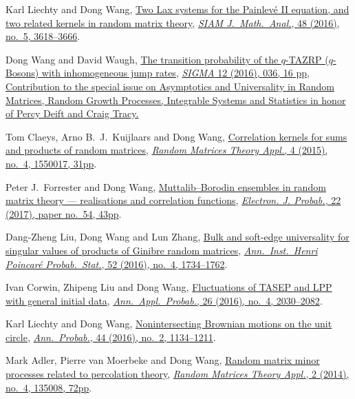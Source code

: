 \documentclass[12pt, a4paper]{article}
\begin{document}
\begin{etaremune}
  Karl Liechty and Dong Wang, \href{http://arxiv.org/abs/1601.01603}{Two Lax systems for the Painlev\'{e} II equation, and two related kernels in random matrix theory}, \href{https://doi.org/10.1137/16M1056080}{\textit{SIAM J.\ Math.\ Anal.}, 48 (2016), no.\ 5, 3618--3666}.
\item
  Dong Wang and David Waugh, \href{http://arxiv.org/abs/1512.01612}{The transition probability of the $q$-TAZRP ($q$-Bosons) with inhomogeneous jump rates}, \href{https://doi.org/10.3842/SIGMA.2016.037}{\textit{SIGMA} 12 (2016), 036, 16 pp, Contribution to the special issue on Asymptotics and Universality in Random Matrices, Random Growth Processes, Integrable Systems and Statistics in honor of Percy Deift and Craig Tracy.}
\item 
  Tom Claeys, Arno B.~J.~Kuijlaars and Dong Wang, \href{http://arxiv.org/abs/1505.00610}{Correlation kernels for sums and products of random matrices}, \href{https://doi.org/10.1142/S2010326315500173}{\textit{Random Matrices Theory Appl.}, 4 (2015), no.\ 4, 1550017, 31pp}.
\item
  Peter J.~Forrester and Dong Wang, \href{http://arxiv.org/abs/1502.07147}{Muttalib--Borodin ensembles in random matrix theory --- realisations and correlation functions}, \href{https://doi.org/10.1214/17-EJP62}{\textit{Electron. J. Probab.}, 22 (2017), paper no.\ 54, 43pp}.
\item
  Dang-Zheng Liu, Dong Wang and Lun Zhang, \href{http://arxiv.org/abs/1412.6777}{Bulk and soft-edge universality for singular values of products of Ginibre random matrices}, \href{https://doi.org/10.1214/15-AIHP696}{\textit{Ann.\ Inst.\ Henri Poincar\'{e} Probab.\ Stat.}, 52 (2016), no.\ 4, 1734--1762}.
\item
  Ivan Corwin, Zhipeng Liu and Dong Wang, \href{http://arxiv.org/abs/1412.5087}{Fluctuations of TASEP and LPP with general initial data}, \href{https://doi.org/10.1214/15-AAP1139}{\textit{Ann.\ Appl.\ Probab.}, 26 (2016), no.\ 4, 2030--2082}.
\item
  Karl Liechty and Dong Wang, \href{http://arxiv.org/abs/1312.7390}{Nonintersecting Brownian motions on the unit circle}, \href{https://doi.org/10.1214/14-AOP998}{\textit{Ann.\ Probab.}, 44 (2016), no.\ 2, 1134--1211}.
\item 
  Mark Adler, Pierre van Moerbeke and Dong Wang,
  \href{http://arxiv.org/abs/1301.7017}{Random matrix minor processes related to percolation theory}, \href{https://doi.org/10.1142/S2010326313500081}{\textit{Random Matrices Theory Appl.}, 2 (2014), no.\ 4, 135008, 72pp}.

\end{etaremune}
\end{document}
